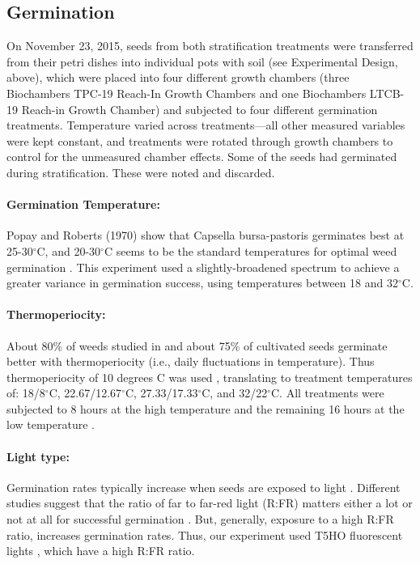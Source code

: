 \documentclass[12pt]{article}\usepackage[]{graphicx}\usepackage[]{color}
\begin{document}
	\subsection{Germination }
	On November 23, 2015, seeds from both stratification treatments were transferred from their petri dishes into individual pots with soil (see Experimental Design, above), which were placed into four different growth chambers (three Biochambers TPC-19 Reach-In Growth Chambers and one Biochambers LTCB-19 Reach-in Growth Chamber) and subjected to four different germination treatments. Temperature varied across treatments---all other measured variables were kept constant, and treatments were rotated through growth chambers to control for the unmeasured chamber effects. Some of the seeds had germinated during stratification. These were noted and discarded.
	
	\paragraph{Germination Temperature:} Popay and Roberts (1970) show that Capsella bursa-pastoris germinates best at 25-30$^\circ$C, and 20-30$^\circ$C seems to be the standard temperatures for optimal weed germination \parencite{Hartmann2010,Steinbauer1957,Wulff1994}. This experiment used a slightly-broadened spectrum to achieve a greater variance in germination success, using temperatures between 18 and 32$^\circ$C. 
	
	\paragraph{Thermoperiocity:} About 80\% of weeds studied in \textcite{Steinbauer1957} and about 75\% of cultivated seeds germinate better with thermoperiocity (i.e., daily fluctuations in temperature)\parencite{Toole1963,ISTA1954}. Thus thermoperiocity of 10 degrees C was used \parencite[see e.g.,][]{Steinbauer1957}, translating to treatment temperatures of: 18/8$^\circ$C, 22.67/12.67$^\circ$C, 27.33/17.33$^\circ$C, and 32/22$^\circ$C. All treatments were subjected to 8 hours at the high temperature and the remaining 16 hours at the low temperature \parencite{Baskin1998,Roberts1981,Popay1970,Probert2000}.
	
	
	\paragraph{Light type:} Germination rates typically increase when seeds are exposed to light \parencite[e.g.,][]{Baskin1998,Pons2000,Popay1970}. Different studies suggest that the ratio of far to far-red light (R:FR) matters either a lot or not at all for successful germination \parencite[e.g.,][]{Popay1970,Pons2000,Wulff1994}. But, generally, exposure to a high R:FR ratio, increases germination rates. Thus, our experiment used T5HO fluorescent lights \parencite{Toole1963}, which have a high R:FR ratio. 
	
\end{document}
